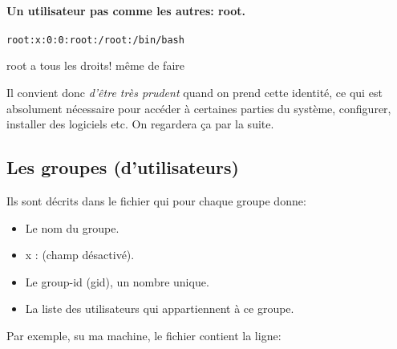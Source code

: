 
\paragraph{Un utilisateur pas comme les autres: \textsf{root}.}
\begin{center}
  \texttt{root:x:0:0:root:/root:/bin/bash}
\end{center}
\textsf{root} a tous les droits! même de faire


Il
convient donc \emph{d'être très prudent} quand on prend cette identité, ce qui
est absolument nécessaire pour accéder à certaines parties du système,
configurer, installer des logiciels etc. On regardera ça par la suite.

\subsection{Les groupes (d'utilisateurs)}
Ils sont décrits dans le fichier  qui pour chaque groupe
donne:
\begin{itemize}
\item Le nom du groupe.
\item x : (champ désactivé).
\item Le group-id (gid), un nombre unique.
\item La liste des utilisateurs qui appartiennent à ce groupe.
\end{itemize}

Par exemple, su ma machine, le fichier  contient la ligne:

